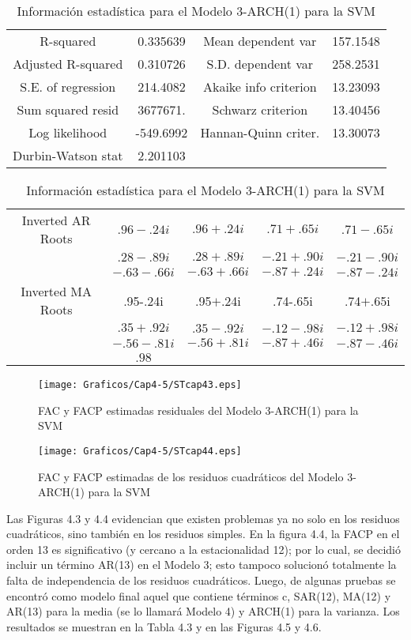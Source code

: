 \begin{table}[H]
\centering
\begin{tabular}{cccc}\hline\hline
R-squared& 0.335639& Mean dependent var & 157.1548 \\
Adjusted R-squared& 0.310726& S.D. dependent var& 258.2531 \\
S.E. of regression& 214.4082& Akaike info criterion & 13.23093 \\
Sum squared resid& 3677671.& Schwarz criterion & 13.40456 \\
Log likelihood& -549.6992& Hannan-Quinn criter. & 13.30073 \\
Durbin-Watson stat& 2.201103& \\ \hline\hline
\end{tabular}

\begin{tabular}{ccccc} \hline\hline
Inverted AR Roots& $.96-.24i$& $.96+.24i$& $.71+.65i$& $.71-.65i$ \\
& $.28-.89i$& $.28+.89i$& $-.21+.90i$& $-.21-.90i$ \\
& $-.63-.66i$& $-.63+.66i$& $-.87+.24i$& $-.87-.24i$ \\
Inverted MA Roots& .95-.24i& .95$+$.24i& .74-.65i& .74$+$.65i \\
& $.35+.92i$& $.35-.92i$& $-.12-.98i$& $-.12+.98i$ \\
& $-.56-.81i$& $-.56+.81i$& $-.87+.46i$& $-.87-.46i$ \\
& $.98$ & &  \\ \hline\hline
\end{tabular}
\caption{Informaci\'{o}n estad\'{i}stica para el Modelo 3-ARCH(1) para la SVM}
\end{table}


\begin{figure}[H]
\centering
\texttt{[image: Graficos/Cap4-5/STcap43.eps]}
\caption{FAC y FACP estimadas residuales del Modelo 3-ARCH(1) para la SVM}
\end{figure}

\begin{figure}[H]
\centering
\texttt{[image: Graficos/Cap4-5/STcap44.eps]}
\caption{FAC y FACP estimadas de los residuos cuadr\'{a}ticos del Modelo 3-ARCH(1) para la SVM}
\end{figure}

Las Figuras 4.3 y 4.4 evidencian que existen problemas ya no solo en los residuos cuadr\'{a}ticos, sino tambi\'{e}n en los residuos simples. En la figura 4.4, la FACP en el orden 13 es significativo (y cercano a la estacionalidad 12); por lo cual, se decidi\'{o} incluir un t\'{e}rmino AR(13) en el Modelo 3; esto tampoco solucion\'{o} totalmente la falta de independencia de los residuos cuadr\'{a}ticos. Luego, de algunas pruebas se encontr\'{o} como modelo final aquel que contiene t\'{e}rminos c, SAR(12), MA(12) y AR(13) para la media (se lo llamar\'{a} Modelo 4) y ARCH(1) para la varianza. Los resultados se muestran en la Tabla 4.3 y en las Figuras 4.5 y 4.6. 